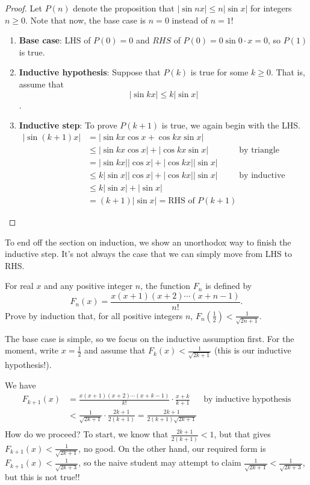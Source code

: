 \documentclass[../jarvis.tex]{subfiles}
\begin{document}
\begin{proof}
    Let $P(n)$ denote the proposition that $|\sin{nx|}\leq n|\sin{x}|$ for integers $n\geq 0$. Note that now, the base case is $n=0$ instead of $n=1$!

    \begin{enumerate}
        \item \textbf{Base case}: LHS of $P(0)=0$ and $RHS$ of $P(0)=0\sin{0\cdot x}=0$, so $P(1)$ is true.
        \item \textbf{Inductive hypothesis}: Suppose that $P(k)$ is true for some $k \geq 0$. That is, assume that $$|\sin{kx}|\leq k|\sin{x}|$$.
        \item \textbf{Inductive step}: To prove $P(k+1)$ is true, we again begin with the LHS.
        \begin{align*}
            |\sin{(k+1)x}| &= |\sin{kx}\cos{x}+\cos{kx}\sin{x}| \\
            &\leq |\sin{kx}\cos{x}|+|\cos{kx}\sin{x}| &\text{by triangle inequality}\\
            &=|\sin{kx}||\cos{x}|+|\cos{kx}||\sin{x}| \\
            &\leq k|\sin{x}||\cos{x}|+|\cos{kx}||\sin{x}| &\text{by inductive hypothesis} \\
            &\leq k|\sin{x}|+|\sin{x}| \\
            &= (k+1)|\sin{x}|=\text{RHS of $P(k+1)$}
        \end{align*} 
    \end{enumerate}
\end{proof}
To end off the section on induction, we show an unorthodox way to finish the inductive step. It's not always the case that we can simply move from LHS to RHS.
\begin{example}
For real $x$ and any positive integer $n$, the function $F_n$ is defined by
    $$F_n(x)=\frac{x(x+1)(x+2)\cdots(x+n-1)}{n!}.$$
Prove by induction that, for all positive integers $n$, $F_n\left(\frac{1}{2}\right) < \frac{1}{\sqrt{2n+1}}$.
\end{example}
    The base case is simple, so we focus on the inductive assumption first. For the moment, write $x=\frac{1}{2}$ and assume that $F_k(x)<\frac{1}{\sqrt{2k+1}}$ (this is our inductive hypothesis!).
    
    We have
    \begin{align*}
        F_{k+1}(x)&=\frac{x(x+1)(x+2)\cdots(x+k-1)}{k!} \cdot \frac{x+k}{k+1} &\text{by inductive hypothesis}\\
        &< \frac{1}{\sqrt{2k+1}} \cdot \frac{2k+1}{2(k+1)} = \frac{2k+1}{2(k+1)\sqrt{2k+1}} \\
    \end{align*}
    How do we proceed? To start, we know that $\frac{2k+1}{2(k+1)} < 1$, but that gives $F_{k+1}(x) < \frac{1}{\sqrt{2k+1}}$, no good. On the other hand, our required form is $F_{k+1}(x) < \frac{1}{\sqrt{2k+3}}$, so the naive student may attempt to claim $\frac{1}{\sqrt{2k+1}} < \frac{1}{\sqrt{2k+3}}$, but this is not true!!
    
\end{document}
